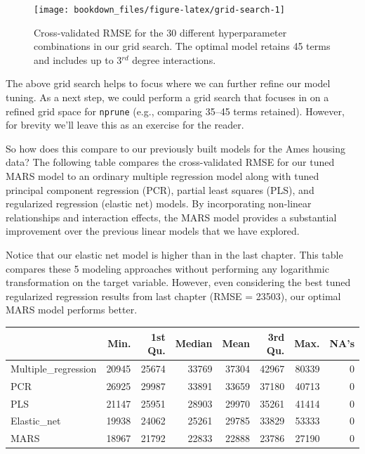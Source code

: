 \documentclass[]{krantz}
\makeatletter
\newenvironment{kframe}{%
\medskip{}
\setlength{\fboxsep}{.8em}
 \def\at@end@of@kframe{}%
 \ifinner\ifhmode%
  \def\at@end@of@kframe{\end{minipage}}%
  \begin{minipage}{\columnwidth}%
 \fi\fi%
 \def\FrameCommand##1{\hskip\@totalleftmargin \hskip-\fboxsep
 \colorbox{shadecolor}{##1}\hskip-\fboxsep
     \hskip-\linewidth \hskip-\@totalleftmargin \hskip\columnwidth}%
 \MakeFramed {\advance\hsize-\width
   \@totalleftmargin\z@ \linewidth\hsize
   \@setminipage}}%
 {\par\unskip\endMakeFramed%
 \at@end@of@kframe}
\newenvironment{block}[1]
  {
  \begin{itemize}
  \renewcommand{\labelitemi}{
    \raisebox{-.7\height}[0pt][0pt]{
      {\setkeys{Gin}{width=3em,keepaspectratio}\texttt{[image: icons/\#1]}}
    }
  }
  \setlength{\fboxsep}{1em}
  \begin{kframe}
  \item
  }
  {
  \end{kframe}
  \end{itemize}
  }
\newenvironment{note}
  {\begin{block}{note}}
  {\end{block}}
\makeatother
\begin{document}
\begin{figure}

{\centering \texttt{[image: bookdown\_files/figure-latex/grid-search-1]} 

}

\caption{Cross-validated RMSE for the 30 different hyperparameter combinations in our grid search. The optimal model retains 45 terms and includes up to 3$^{rd}$ degree interactions.}\label{fig:grid-search}
\end{figure}

The above grid search helps to focus where we can further refine our model tuning. As a next step, we could perform a grid search that focuses in on a refined grid space for \texttt{nprune} (e.g., comparing 35--45 terms retained). However, for brevity we'll leave this as an exercise for the reader.

So how does this compare to our previously built models for the Ames housing data? The following table compares the cross-validated RMSE for our tuned MARS model to an ordinary multiple regression model along with tuned principal component regression (PCR), partial least squares (PLS), and regularized regression (elastic net) models. By incorporating non-linear relationships and interaction effects, the MARS model provides a substantial improvement over the previous linear models that we have explored.

\begin{note}
Notice that our elastic net model is higher than in the last chapter.
This table compares these 5 modeling approaches without performing any
logarithmic transformation on the target variable. However, even
considering the best tuned regularized regression results from last
chapter (RMSE = 23503), our optimal MARS model performs better.
\end{note}

\begin{tabular}{l|r|r|r|r|r|r|r}
\hline
  & Min. & 1st Qu. & Median & Mean & 3rd Qu. & Max. & NA's\\
\hline
Multiple\_regression & 20945 & 25674 & 33769 & 37304 & 42967 & 80339 & 0\\
\hline
PCR & 26925 & 29987 & 33891 & 33659 & 37180 & 40713 & 0\\
\hline
PLS & 21147 & 25951 & 28903 & 29970 & 35261 & 41414 & 0\\
\hline
Elastic\_net & 19938 & 24062 & 25261 & 29785 & 33829 & 53333 & 0\\
\hline
MARS & 18967 & 21792 & 22833 & 22888 & 23786 & 27190 & 0\\
\hline
\end{tabular}
\end{document}
